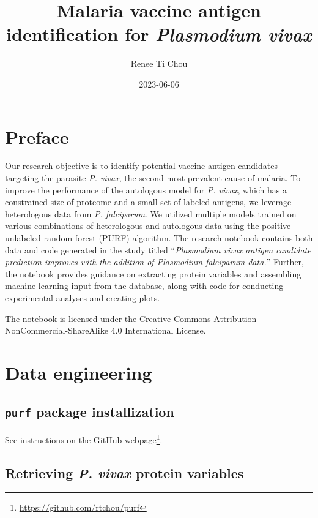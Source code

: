 \documentclass[
  11pt,
  oneside]{book}
\title{Malaria vaccine antigen identification for \emph{Plasmodium vivax}}
\author{Renee Ti Chou}
\date{2023-06-06}
\renewcommand{\href}[2]{#2\footnote{\url{#1}}}
\begin{document}
\maketitle

{
\hypersetup{linkcolor=}
\setcounter{tocdepth}{2}
\tableofcontents
}
\mainmatter

\hypertarget{preface}{%
\chapter*{Preface}\label{preface}}

Our research objective is to identify potential vaccine antigen candidates targeting the parasite \emph{P. vivax}, the second most prevalent cause of malaria. To improve the performance of the autologous model for \emph{P. vivax}, which has a constrained size of proteome and a small set of labeled antigens, we leverage heterologous data from \emph{P. falciparum}. We utilized multiple models trained on various combinations of heterologous and autologous data using the positive-unlabeled random forest (PURF) algorithm. The research notebook contains both data and code generated in the study titled ``\emph{Plasmodium vivax antigen candidate prediction improves with the addition of Plasmodium falciparum data.}'' Further, the notebook provides guidance on extracting protein variables and assembling machine learning input from the database, along with code for conducting experimental analyses and creating plots.

The notebook is licensed under the Creative Commons Attribution-NonCommercial-ShareAlike 4.0 International License.

\hypertarget{01_data_engineering}{%
\chapter{Data engineering}\label{01_data_engineering}}

\hypertarget{purf-package-installization}{%
\section{\texorpdfstring{\texttt{purf} package installization}{purf package installization}}\label{purf-package-installization}}

See instructions on the \href{https://github.com/rtchou/purf}{GitHub webpage}.

\hypertarget{retrieving-p.-vivax-protein-variables}{%
\section{\texorpdfstring{Retrieving \emph{P. vivax} protein variables}{Retrieving P. vivax protein variables}}\label{retrieving-p.-vivax-protein-variables}}
\end{document}
